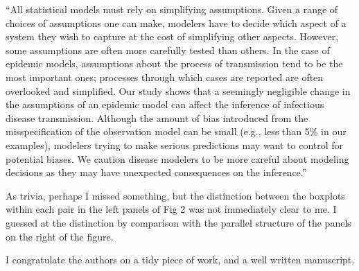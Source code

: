 \documentclass[12pt]{article}
\newcommand{\revtext}{\textsf}
\begin{document}
``All statistical models must rely on simplifying assumptions.
Given a range of choices of assumptions one can make, modelers have to
decide which aspect of a system they wish to capture 
at the cost of simplifying other aspects.
However, some assumptions are often more carefully tested than others.
In the case of epidemic models, assumptions about the process of transmission tend to be
the most important ones; processes through which cases are reported are often 
overlooked and simplified.
Our study shows that a seemingly negligible change in the assumptions of an epidemic
model can affect the inference of 
infectious disease transmission.
Although the amount of bias introduced from the misspecification of the observation
model can be small (e.g., less than 5\% in our examples), modelers
trying to make serious predictions may want to control for potential biases.
We caution disease modelers to be more careful about modeling decisions as they may have unexpected consequences on the inference.''

\revtext{As trivia, perhaps I missed something, but the distinction between the boxplots within each pair in the left panels of Fig 2 was not immediately clear to me.  I guessed at the distinction by comparison with the parallel structure of the panels on the right of the figure.}

\revtext{I congratulate the authors on a tidy piece of work, and a well written manuscript.}
\end{document}
